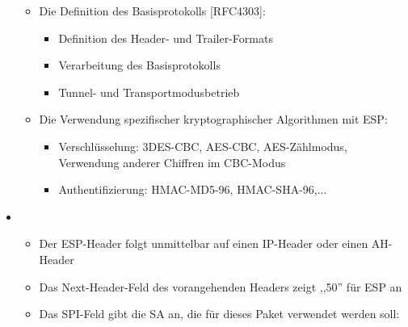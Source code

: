 \documentclass[a4paper]{article}
\begin{document}
\begin{multicols}{3}
\begin{itemize}
              \begin{itemize}
                  \item
                        Die Definition des Basisprotokolls {[}RFC4303{]}:

                        \begin{itemize}
                            \item
                                  Definition des Header- und Trailer-Formats
                            \item
                                  Verarbeitung des Basisprotokolls
                            \item
                                  Tunnel- und Transportmodusbetrieb
                        \end{itemize}
                  \item
                        Die Verwendung spezifischer kryptographischer Algorithmen mit ESP:

                        \begin{itemize}
                            \item
                                  Verschlüsselung: 3DES-CBC, AES-CBC, AES-Zählmodus, Verwendung
                                  anderer Chiffren im CBC-Modus
                            \item
                                  Authentifizierung: HMAC-MD5-96, HMAC-SHA-96,...
                        \end{itemize}
              \end{itemize}
        \item

              \begin{itemize}
                  \item
                        Der ESP-Header folgt unmittelbar auf einen IP-Header oder einen
                        AH-Header
                  \item
                        Das Next-Header-Feld des vorangehenden Headers zeigt ,,50'' für ESP
                        an
                  \item
                        Das SPI-Feld gibt die SA an, die für dieses Paket verwendet werden
                        soll:


\end{itemize}
\end{itemize}
\end{multicols}
\end{document}
